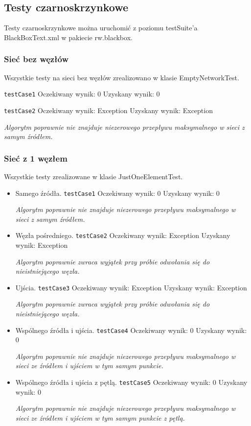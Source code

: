 \subsection{Testy czarno\dywiz skrzynkowe}

Testy czarnoskrzynkowe można uruchomić z poziomu testSuite'a BlackBoxText.xml
w pakiecie rw.blackbox.

\subsubsection{Sieć bez węzłów}
Wszystkie testy na sieci bez węzłów zrealizowano w klasie EmptyNetworkTest.

\texttt{testCase1}
Oczekiwany wynik: 0
Uzyskany wynik: 0

\texttt{testCase2}
Oczekiwany wynik: Exception
Uzyskany wynik: Exception

\emph{Algorytm poprawnie nie znajduje niezerowego przepływu maksymalnego w sieci
z samym źródłem.}

\subsubsection{Sieć z 1 węzłem}
Wszystkie testy zrealizowane w klasie JustOneElementTest.
\begin{itemize}[nosep]
    \item Samego źródła.
    \texttt{testCase1}
    Oczekiwany wynik: 0
    Uzyskany wynik: 0

    \emph{Algorytm poprawnie nie znajduje niezerowego przepływu maksymalnego w sieci
    z samym źródłem.}

    \item Węzła pośredniego.
    \texttt{testCase2}
    Oczekiwany wynik: Exception
    Uzyskany wynik: Exception

    \emph{Algorytm poprawnie zwraca wyjątek przy próbie odwołania się
    do nieistniejącego węzła.}

    \item Ujścia.
    \texttt{testCase3}
    Oczekiwany wynik: Exception
    Uzyskany wynik: Exception

    \emph{Algorytm poprawnie zwraca wyjątek przy próbie odwołania się
    do nieistniejącego węzła.}

    \item Wspólnego źródła i ujścia.
    \texttt{testCase4}
    Oczekiwany wynik: 0
    Uzyskany wynik: 0

    \emph{Algorytm poprawnie nie znajduje niezerowego
    przepływu maksymalnego w sieci ze źródłem i ujściem w tym samym punkcie.}

    \item Wspólnego źródła i ujścia z pętlą.
    \texttt{testCase5}
    Oczekiwany wynik: 0
    Uzyskany wynik: 0

    \emph{Algorytm poprawnie nie znajduje niezerowego
    przepływu maksymalnego w sieci ze źródłem i ujściem w tym samym punkcie z pętlą.}
\end{itemize}


